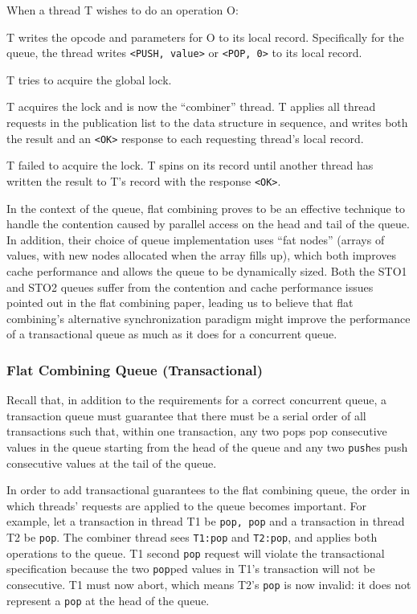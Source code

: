 When a thread T wishes to do an operation O:
\begin{ordlist}
    \item T writes the opcode and parameters for O to its local record. Specifically for the queue, the thread writes \texttt{<PUSH, value>} or \texttt{<POP, 0>} to its local record.
   \item T tries to acquire the global lock.
   \begin{ordlist}
        \item T acquires the lock and is now the “combiner” thread. T applies all thread requests in the publication list to the data structure in sequence, and writes both the result and an \texttt{<OK>} response to each requesting thread’s local record.
        \item T failed to acquire the lock. T spins on its record until another thread has written the result to T’s record with the response \texttt{<OK>}.
    \end{ordlist}
\end{ordlist}

In the context of the queue, flat combining proves to be an effective technique to handle the contention caused by parallel access on the head and tail of the queue. In addition, their choice of queue implementation uses “fat nodes” (arrays of values, with new nodes allocated when the array fills up), which both improves cache performance and allows the queue to be dynamically sized. Both the STO1 and STO2 queues suffer from the contention and cache performance issues pointed out in the flat combining paper, leading us to believe that flat combining’s alternative synchronization paradigm might improve the performance of a transactional queue as much as it does for a concurrent queue.

\subsubsection{Flat Combining Queue (Transactional)}


Recall that, in addition to the requirements for a correct concurrent queue, a transaction queue must guarantee that there must be a serial order of all transactions such that, within one transaction, any two pops pop consecutive values in the queue starting from the head of the queue and any two \texttt{push}es push consecutive values at the tail of the queue.

In order to add transactional guarantees to the flat combining queue, the order in which threads’ requests are applied to the queue becomes important. For example, let a transaction in thread T1 be \texttt{pop, pop} and a transaction in thread T2 be \texttt{pop}. The combiner thread sees \texttt{T1:pop} and \texttt{T2:pop}, and applies both operations to the queue. T1 second \texttt{pop} request will violate the transactional specification because the two \texttt{pop}ped values in T1’s transaction will not be consecutive. T1 must now abort, which means T2’s \texttt{pop} is now invalid: it does not represent a \texttt{pop} at the head of the queue.

